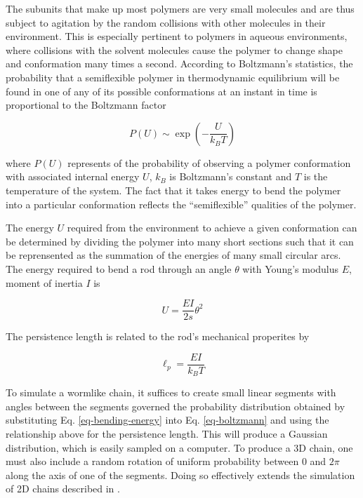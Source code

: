 \documentclass[11pt]{article}
\begin{document}
The subunits that make up most polymers are very small molecules and
are thus subject to agitation by the random collisions with other
molecules in their environment. This is especially pertinent to
polymers in aqueous environments, where collisions with the solvent
molecules cause the polymer to change shape and conformation many
times a second. According to Boltzmann's statistics, the probability
that a semiflexible polymer in thermodynamic equilibrium will be found
in one of any of its possible conformations at an instant in time is
proportional to the Boltzmann factor

\begin{equation}
  \label{eq-boltzmann}
  P \left( U \right) \sim \exp \left( -\frac{U}{k_B T}\right)
\end{equation}

where $P \left( U \right)$ represents of the probability of observing
a polymer conformation with associated internal energy $U$, $k_B$ is
Boltzmann's constant and $T$ is the temperature of the system. The
fact that it takes energy to bend the polymer into a particular
conformation reflects the ``semiflexible'' qualities of the polymer.

The energy $U$ required from the environment to achieve a given
conformation can be determined by dividing the polymer into many short
sections such that it can be reprensented as the summation of the
energies of many small circular arcs. The energy required to bend a
rod through an angle $\theta$ with Young's modulus $E$, moment of
inertia $I$ is

\begin{equation}
\label{eq-bending-energy}
  U = \frac{EI}{2s}\theta^{2}
\end{equation}

The persistence length is related to the rod's mechanical properites
by \cite{phillips-pbotc-2009}

\begin{equation}
  \ell_p = \frac{EI}{k_{B}T}
\end{equation}

To simulate a wormlike chain, it suffices to create small linear
segments with angles between the segments governed the probability
distribution obtained by substituting Eq. \ref{eq-bending-energy} into
Eq. \ref{eq-boltzmann} and using the relationship above for the
persistence length. This will produce a Gaussian distribution, which
is easily sampled on a computer. To produce a 3D chain, one must also
include a random rotation of uniform probability between 0 and $2\pi$
along the axis of one of the segments. Doing so effectively extends
the simulation of 2D chains described in \cite{rivetti-jmolbiol-1996}.
\end{document}
